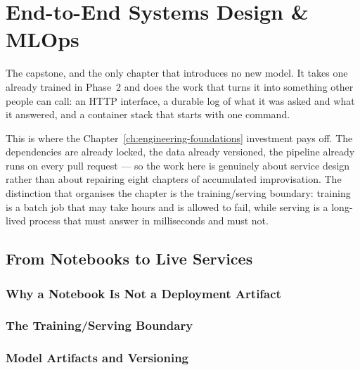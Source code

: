 %
\chapter{End-to-End Systems Design \& MLOps}
\label{ch:capstone}

The capstone, and the only chapter that introduces no new model. It takes one
already trained in Phase~2 and does the work that turns it into something other
people can call: an HTTP interface, a durable log of what it was asked and what
it answered, and a container stack that starts with one command.

This is where the Chapter~\ref{ch:engineering-foundations} investment pays off.
The dependencies are already locked, the data already versioned, the pipeline
already runs on every pull request --- so the work here is genuinely about
service design rather than about repairing eight chapters of accumulated
improvisation. The distinction that organises the chapter is the training/serving
boundary: training is a batch job that may take hours and is allowed to fail,
while serving is a long-lived process that must answer in milliseconds and must
not.

\section{From Notebooks to Live Services}
\label{sec:notebooks-to-services}

\subsection{Why a Notebook Is Not a Deployment Artifact}

\subsection{The Training/Serving Boundary}

\subsection{Model Artifacts and Versioning}

